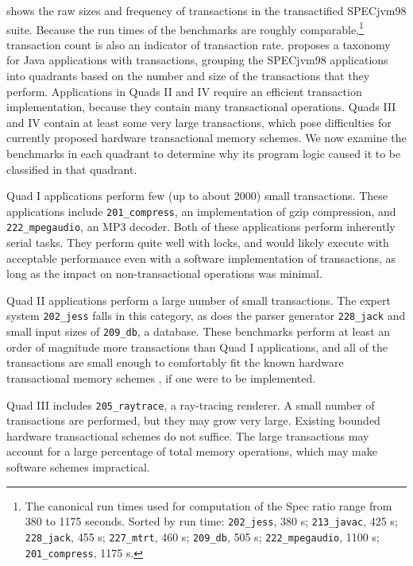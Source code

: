  shows the raw sizes and frequency of transactions in
the transactified SPECjvm98 suite.  Because the run times of the
benchmarks are roughly comparable,\footnote{The canonical run times
  used for computation of the Spec ratio range from 380 to 1175
  seconds.  Sorted by run time: \texttt{202\_jess}, 380 s;
  \texttt{213\_javac}, 425 s; \texttt{228\_jack}, 455 s;
  \texttt{227\_mtrt}, 460 s; \texttt{209\_db}, 505 s;
  \texttt{222\_mpegaudio}, 1100 s; \texttt{201\_compress}, 1175 s.}
transaction count is also an indicator of transaction rate.
 proposes a
taxonomy for Java applications with transactions, grouping the SPECjvm98
applications into quadrants based on the number and size of the
transactions that they perform.  Applications in Quads II and IV
require an efficient transaction implementation, because they contain
many transactional operations.
Quads III and IV contain at least some very large transactions, which
pose difficulties for currently proposed hardware transactional memory
schemes.  We now
examine the benchmarks in each quadrant to determine why its program
logic caused it to be classified in that quadrant.

Quad I applications perform few (up to about 2000) small
transactions.  These applications include \texttt{201\_compress}, an
implementation of gzip compression, and \texttt{222\_mpegaudio}, an
MP3 decoder.  Both of these applications perform inherently serial
tasks.  They perform quite well with locks, and would likely execute
with acceptable performance even with a \naive software
implementation of transactions, as long as the impact on
non-transactional operations was minimal.

Quad II applications perform a large number of small transactions.
The expert system \texttt{202\_jess} falls in this category, as does
the parser generator \texttt{228\_jack} and
small input sizes of \texttt{209\_db}, a database.  These benchmarks
perform at least an order of magnitude more transactions than Quad
I applications, and all of the transactions are small enough to 
comfortably fit the known hardware transactional memory schemes
\cite[etc]{HerlihyMo93}, if
one were to be implemented.

Quad III includes \texttt{205\_raytrace}, a ray-tracing renderer.  A
small number of transactions are performed, but they may grow very
large.  Existing bounded hardware transactional schemes do not
suffice.  The large
transactions may account for a large percentage of total memory
operations, which may make software schemes
impractical.

